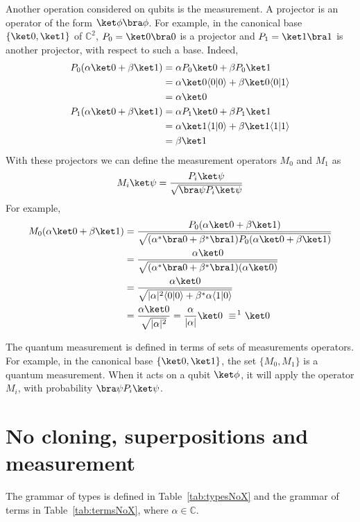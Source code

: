 \documentclass[preprint]{elsarticle}
\newcommand\braket[2]{\langle{#1}|{#2}\rangle}
\begin{document}
Another operation considered on qubits is the measurement. A projector is an
operator of the form $\ket\phi\bra\phi$. For example, in the canonical base
$\{\ket 0,\ket 1\}$ of $\mathbb C^2$, $P_0=\ket 0\bra 0$ is a projector and
$P_1=\ket 1\bra 1$ is another projector, with respect to such a base. Indeed,
\begin{align*}
  P_0(\alpha\ket 0+\beta\ket 1)
  &=\alpha P_0\ket 0+\beta P_0\ket 1\\
  &=\alpha\ket 0\braket 00 +\beta\ket 0\braket 01\\
  &=\alpha\ket 0
  \\
  P_1(\alpha\ket 0+\beta\ket 1)
  &=\alpha P_1\ket 0+\beta P_1\ket 1\\
  &=\alpha\ket 1\braket 10 +\beta\ket 1\braket 11\\
  &=\beta\ket 1
\end{align*}
With these projectors we can define the measurement operators $M_0$ and $M_1$ as
\[
  M_i\ket\psi = \frac{P_i\ket\psi}{\sqrt{\bra\psi P_i\ket\psi}}
\]
For example,
\begin{align*}
  M_0(\alpha\ket 0+\beta\ket 1)
  &=\frac{P_0(\alpha\ket 0+\beta\ket 1)}{\sqrt{(\alpha^*\bra 0+\beta^*\bra 1)P_0(\alpha\ket 0+\beta\ket 1)}}\\
  &=\frac{\alpha\ket 0}{\sqrt{(\alpha^*\bra 0+\beta^*\bra 1)(\alpha\ket 0)}}\\
  &=\frac{\alpha\ket 0}{\sqrt{|\alpha|^2\braket 00+\beta^*\alpha\braket 10}}\\
  &=\frac{\alpha\ket 0}{\sqrt{|\alpha|^2}}
    =\frac{\alpha}{|\alpha|}\ket 0~\equiv\!{\text{\footnotemark}}~\ket 0
\end{align*}

The quantum measurement is defined in terms of sets of measurements operators.
For example, in the canonical base $\{\ket 0,\ket 1\}$, the set $\{M_0,M_1\}$ is
a quantum measurement. When it acts on a qubit $\ket\phi$, it will apply the
operator $M_i$, with probability $\bra\psi P_i\ket\psi$.
\section{No cloning, superpositions and measurement}\label{sec:calculus}
\label{sec:fstGram}\label{sec:fstTS}\label{sec:fstTRS}


The grammar of types is defined in Table~\ref{tab:typesNoX} and the grammar of
terms in Table~\ref{tab:termsNoX}, where $\alpha\in\mathbb C$.
\end{document}
